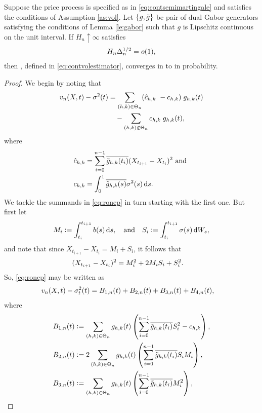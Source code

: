 \begin{prop}\label{pro:finite}
  Suppose the  price process is specified as in \eqref{eq:contsemimartingale} and satisfies the conditions of Assumption \ref{as:vol}. Let $\{g, \tilde{g}\}$ be pair of dual Gabor generators satisfying the conditions of Lemma \ref{le:gabor} such that $g$ is Lipschitz continuous on the unit interval. 
If $H_n \uparrow \infty$ satisfies 
  \begin{align}
    H_n \Delta_n^{1/2} = o(1),\notag
    \label{}
  \end{align}
  then
  \svnx, defined in \eqref{eq:contvolestimator}, converges in \Ltwo to \sv in probability.
\end{prop}
\begin{proof} We begin by noting that 
\begin{align}
  v_n(X, t) - \sigma^2(t) & = \sum_{(h,k) \in \Theta_n} (\hat{c}_{h,k}\ - {c}_{h,k})\;g_{h,k}(t)\notag\\
  & \quad -\sum_{(h,k) \not\in \Theta_n} {c}_{h,k}\;g_{h,k}(t),\label{eq:ronep} 
\end{align}
  where 
\begin{align}  
  \cnhk &= \sum_{i =0}^{n-1} \btghki (X_{t_{i+1}} - X_{t_i})^2 \text{ and }\notag\\  
  \chk &= \int^1_0 \btghks \sigma^2(s) \D s. \notag
\end{align}
We tackle the summands in \eqref{eq:ronep} in turn starting with the first one. But first let 
\begin{align}
  M_i := \int_{t_i}^{t_{i+1}} b(s) \D s, \quad \text{and} \quad  S_i := \int_{t_i}^{t_{i+1}} \sigma(s) \D W_s, \notag
\end{align}
and note that since $X_{t_{i+1}} - X_{t_i} = M_i + S_i$, it follows that
\begin{align}
  (X_{t_{i+1}} - X_{t_i})^2 &= M_i^2  
  + 2M_iS_i +   S_i^2.\notag 
\end{align}
So, \eqref{eq:ronep} may be written as 
\begin{align}
  &v_n(X, t) - \sigma_t^2(t) = B_{1,n}(t) + B_{2,n}(t) + B_{3,n}(t) + B_{4,n}(t), \notag
\end{align}
where
\begin{align}
  &B_{1,n}(t) :=  \sumt g_{h,k}(t) \left(\sum_{i=0}^{n-1} \btghki S_i^2  - \chk\right), \notag\\
  &B_{2,n}(t) := 2 \sumt g_{h,k}(t)\left(\sum_{i=0}^{n-1} \btghki S_i M_i \right), \notag\\
  &B_{3,n}(t) := \sumt g_{h,k}(t)\left( \sum_{i=0}^{n-1} \btghki M_i^2 \right), \notag\\

\end{align}
\end{proof}
